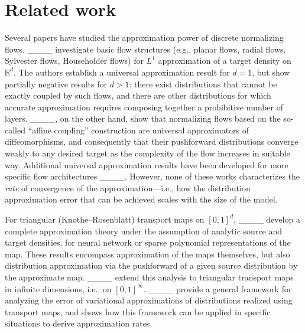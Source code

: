 \section{Related work}

Several papers have studied the approximation power of discrete normalizing flows. ____ investigate basic flow structures (e.g., planar flows, radial flows, Sylvester flows, Householder flows) for $L^1$ approximation of a target density on $\mathbb{R}^d$. The authors establish a universal approximation result for $d=1$, but show partially negative results for $d>1$: there exist distributions that cannot be exactly coupled by such flows, and there are other distributions for which accurate approximation requires composing together a prohibitive number of layers. ____, on the other hand, show that normalizing flows based on the so-called ``affine coupling'' construction are universal approximators of diffeomorphisms, and consequently that their pushforward distributions converge weakly to any desired target as the complexity of the flow increases in suitable way. Additional universal approximation results have been developed for more specific flow architectures ____. However, none of these works characterizes the \emph{rate} of convergence of the approximation---i.e., how the distribution approximation error that can be achieved scales with the size of the model.

For triangular (Knothe--Rosenblatt) transport maps on $[0,1]^d$, ____ develop a complete approximation theory under the assumption of analytic source and target densities, for neural network or sparse polynomial representations of the map. These results encompass approximation of the maps themselves, but also distribution approximation via the pushforward of a given source distribution by the approximate map. ____ extend this analysis to triangular transport maps in infinite dimensions, i.e., on $[0,1]^\infty$. ____ provide a general framework for analyzing the error of variational approximations of distributions realized using transport maps, and shows how this framework can be applied in specific situations to derive approximation rates.

